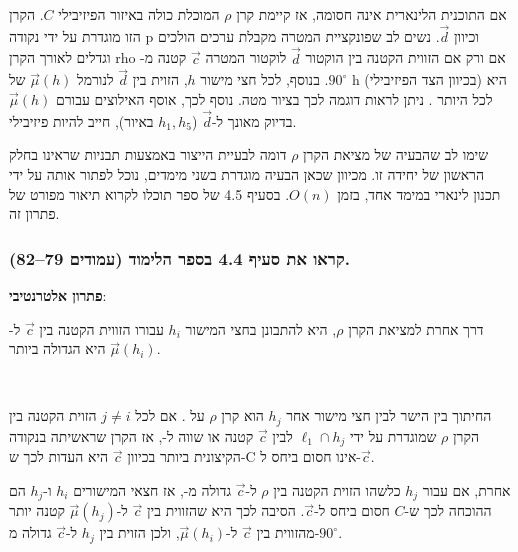\documentclass[
]{book}
\begin{document}
אם התוכנית הלינארית אינה חסומה, אז קיימת קרן \(\rho\) המוכלת כולה באיזור הפיזיבילי \(C\). הקרן הזו מוגדרת על ידי נקודה p וכיוון \(\overrightarrow{d}\). נשים לב שפונקציית המטרה מקבלת ערכים הולכים וגדלים לאורך הקרן rho אם ורק אם הזווית הקטנה בין הוקטור \(\overrightarrow{d}\) לוקטור המטרה \(\overrightarrow{c}\) קטנה מ-\(90 ^\circ\). בנוסף, לכל חצי מישור \(h\), הזוית בין \(\overrightarrow{d}\) לנורמל \(\overrightarrow{\mu}( h )\) של h (בכיוון הצד הפיזיבילי) היא לכל היותר . ניתן לראות דוגמה לכך בציור מטה. נוסף לכך, אוסף האילוצים עבורם \(\overrightarrow{\mu}( h )\) בדיוק מאונך ל-\(\overrightarrow{d}\) (\(h_1, h_5\) באיור), חייב להיות פיזיבילי.

שימו לב שהבעיה של מציאת הקרן \(\rho\) דומה לבעיית הייצור באמצעות תבניות שראינו בחלק הראשון של יחידה זו. מכיוון שכאן הבעיה מוגדרת בשני מימדים, נוכל לפתור אותה על ידי תכנון לינארי במימד אחד, בזמן \(O( n )\). בסעיף 4.5 של ספר תוכלו לקרוא תיאור מפורט של פתרון זה.

\hypertarget{ux5e7ux5e8ux5d0ux5d5-ux5d0ux5ea-ux5e1ux5e2ux5d9ux5e3-4.4-ux5d1ux5e1ux5e4ux5e8-ux5d4ux5dcux5d9ux5deux5d5ux5d3-ux5e2ux5deux5d5ux5d3ux5d9ux5dd-7982.}{%
\subsubsection*{קראו את סעיף 4.4 בספר הלימוד (עמודים 79--82).}\label{ux5e7ux5e8ux5d0ux5d5-ux5d0ux5ea-ux5e1ux5e2ux5d9ux5e3-4.4-ux5d1ux5e1ux5e4ux5e8-ux5d4ux5dcux5d9ux5deux5d5ux5d3-ux5e2ux5deux5d5ux5d3ux5d9ux5dd-7982.}}

\textbf{פתרון אלטרנטיבי}:

דרך אחרת למציאת הקרן \(\rho\), היא להתבונן בחצי המישור \(h_i\) עבורו הזווית הקטנה בין \(\overrightarrow{c}\) ל-\(\overrightarrow{\mu}( h_i )\) היא הגדולה ביותר.

~\\
\hspace*{0.333em}

החיתוך בין הישר לבין חצי מישור אחר \(h_j\) הוא קרן \(\rho\) על . אם לכל \(j \neq i\) הזוית הקטנה בין הקרן \(\rho\) שמוגדרת על ידי \(\ell_1 \cap h_j\) לבין \(\overrightarrow{c}\) קטנה או שווה ל-, אז הקרן שראשיתה בנקודה הקיצונית ביותר בכיוון \(\overrightarrow{c}\) היא העדות לכך ש-C אינו חסום ביחס ל-\(\overrightarrow{c}\).

אחרת, אם עבור \(h_j\) כלשהו הזוית הקטנה בין \(\rho\) ל-\(\overrightarrow{c}\) גדולה מ-, אז חצאי המישורים \(h_i\) ו-\(h_j\) הם ההוכחה לכך ש-\(C\) חסום ביחס ל-\(\overrightarrow{c}\). הסיבה לכך היא שהזווית בין \(\overrightarrow{c}\) ל-\(\overrightarrow{\mu}( h_j )\) קטנה יותר מהזווית בין \(\overrightarrow{c}\) ל-\(\overrightarrow{\mu}( h_i )\), ולכן הזוית בין \(h_j\) ל-\(\overrightarrow{c}\) גדולה מ-\(90^\circ\).
~
\end{document}
